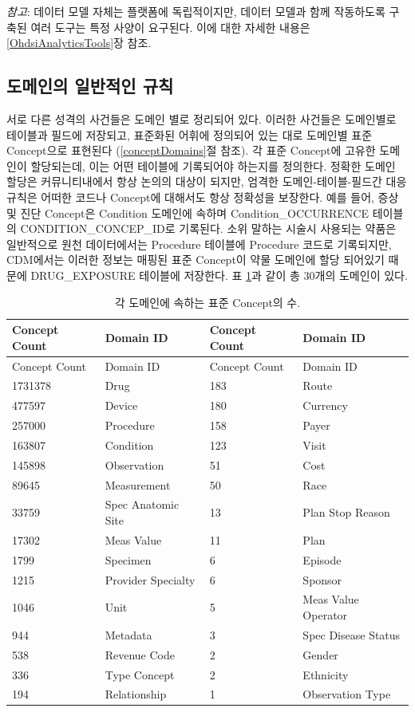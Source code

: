 \documentclass[11pt]{book}
\theoremstyle{definition}
\theoremstyle{definition}
\theoremstyle{definition}
\theoremstyle{remark}
\begin{document}
\emph{참고}: 데이터 모델 자체는 플랫폼에 독립적이지만, 데이터 모델과
함께 작동하도록 구축된 여러 도구는 특정 사양이 요구된다. 이에 대한
자세한 내용은 \ref{OhdsiAnalyticsTools}장 참조.

\subsection{도메인의 일반적인 규칙}\label{domains}

서로 다른 성격의 사건들은 도메인 별로 정리되어 있다. 이러한 사건들은
도메인별로 테이블과 필드에 저장되고, 표준화된 어휘에 정의되어 있는 대로
도메인별 표준 Concept으로 표현된다 (\ref{conceptDomains}절 참조). 각
표준 Concept에 고유한 도메인이 할당되는데, 이는 어떤 테이블에 기록되어야
하는지를 정의한다. 정확한 도메인 할당은 커뮤니티내에서 항상 논의의
대상이 되지만, 엄격한 도메인-테이블-필드간 대응 규칙은 어떠한 코드나
Concept에 대해서도 항상 정확성을 보장한다. 예를 들어, 증상 및 진단
Concept은 Condition 도메인에 속하며 Condition\_OCCURRENCE 테이블의
CONDITION\_CONCEP\_ID로 기록된다. 소위 말하는 시술시 사용되는 약품은
일반적으로 원천 데이터에서는 Procedure 테이블에 Procedure 코드로
기록되지만, CDM에서는 이러한 정보는 매핑된 표준 Concept이 약물 도메인에
할당 되어있기 때문에 DRUG\_EXPOSURE 테이블에 저장한다. 표
\ref{tab:domains}과 같이 총 30개의 도메인이 있다.

\begin{longtable}[]{@{}llll@{}}
\caption{\label{tab:domains} 각 도메인에 속하는 표준 Concept의
수.}\tabularnewline
\toprule
Concept Count & Domain ID & Concept Count & Domain ID\tabularnewline
\midrule
\endfirsthead
\toprule
Concept Count & Domain ID & Concept Count & Domain ID\tabularnewline
\midrule
\endhead
1731378 & Drug & 183 & Route\tabularnewline
477597 & Device & 180 & Currency\tabularnewline
257000 & Procedure & 158 & Payer\tabularnewline
163807 & Condition & 123 & Visit\tabularnewline
145898 & Observation & 51 & Cost\tabularnewline
89645 & Measurement & 50 & Race\tabularnewline
33759 & Spec Anatomic Site & 13 & Plan Stop Reason\tabularnewline
17302 & Meas Value & 11 & Plan\tabularnewline
1799 & Specimen & 6 & Episode\tabularnewline
1215 & Provider Specialty & 6 & Sponsor\tabularnewline
1046 & Unit & 5 & Meas Value Operator\tabularnewline
944 & Metadata & 3 & Spec Disease Status\tabularnewline
538 & Revenue Code & 2 & Gender\tabularnewline
336 & Type Concept & 2 & Ethnicity\tabularnewline
194 & Relationship & 1 & Observation Type\tabularnewline
\bottomrule
\end{longtable}
\end{document}
